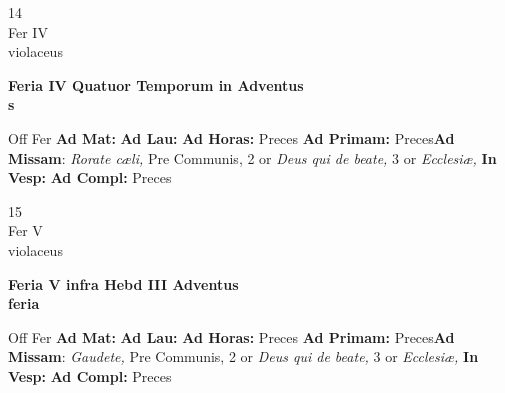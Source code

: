 \documentclass[10pt, openany]{book}
\begin{document}
    \begin{center}
        \begin{minipage}{3.5in}
            \vspace{2em}
            \begin{minipage}{0.5in}
                {\Huge 14} \\
                {\normalsize Fer IV} \\
                {\normalsize violaceus}
            \end{minipage}
            \begin{minipage}{3.0in}
                \textbf{ \large Feria IV Quatuor Temporum in Adventus \\
                \textnormal{\normalsize s}} \\ 
            \end{minipage}
            \begin{justify}Off Fer
                \textbf{Ad Mat: }
                \textbf{Ad Lau: }
                \textbf{Ad Horas: }Preces
                \textbf{Ad Primam: }Preces\textbf{Ad Missam}: \textit{Rorate cæli,} Pre Communis, 2 or \textit{Deus qui de beate,} 3 or \textit{Ecclesiæ,}  
                \textbf{In Vesp: }
                \textbf{Ad Compl: }Preces
            \end{justify}
        \end{minipage}
    \end{center}

    \begin{center}
        \begin{minipage}{3.5in}
            \vspace{2em}
            \begin{minipage}{0.5in}
                {\Huge 15} \\
                {\normalsize Fer V} \\
                {\normalsize violaceus}
            \end{minipage}
            \begin{minipage}{3.0in}
                \textbf{ \large Feria V infra Hebd III Adventus \\
                \textnormal{\normalsize feria}} \\ 
            \end{minipage}
            \begin{justify}Off Fer
                \textbf{Ad Mat: }
                \textbf{Ad Lau: }
                \textbf{Ad Horas: }Preces
                \textbf{Ad Primam: }Preces\textbf{Ad Missam}: \textit{Gaudete,} Pre Communis, 2 or \textit{Deus qui de beate,} 3 or \textit{Ecclesiæ,}  
                \textbf{In Vesp: }
                \textbf{Ad Compl: }Preces
            \end{justify}
        \end{minipage}
    \end{center}
\end{document}
